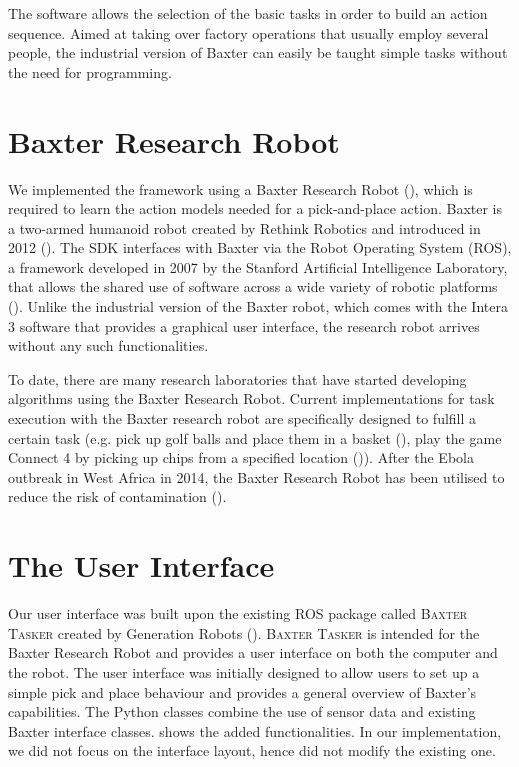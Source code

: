 The software allows the selection of the basic tasks in order to build an action sequence.
Aimed at taking over factory operations that usually employ several people, the industrial version of Baxter can easily be taught simple tasks without the need for programming.


\section{Baxter Research Robot}
We implemented the framework using a Baxter Research Robot (\cite{robotics2013baxter}), which is required to learn the action models needed for a pick-and-place action.
Baxter is a two-armed humanoid robot created by Rethink Robotics and introduced in 2012 (\cite{robotics2013baxter}).
The SDK interfaces with Baxter via the Robot Operating System (ROS), a framework developed in 2007 by the Stanford Artificial Intelligence Laboratory, that allows the shared use of software across a wide variety of robotic platforms (\cite{fernandez2015learning}).
Unlike the industrial version of the Baxter robot, which comes with the Intera 3 software that provides a graphical user interface, the research robot arrives without any such functionalities.

To date, there are many research laboratories that have started developing algorithms using the Baxter Research Robot.
Current implementations for task execution with the Baxter research robot are specifically designed to fulfill a certain task (e.g.
pick up golf balls and place them in a basket (\cite{BaxterGolf}), play the game Connect 4 by picking up chips from a specified location (\cite{Connect4})).
After the Ebola outbreak in West Africa in 2014, the Baxter Research Robot has been utilised to reduce the risk of contamination (\cite{Ebola}).


\section{The User Interface}
Our user interface was built upon the existing ROS package called \textsc{Baxter Tasker} created by Generation Robots (\cite{BaxterTasker}).
\textsc{Baxter Tasker} is intended for the Baxter Research Robot and provides a user interface on both the computer and the robot.
The user interface was initially designed to allow users to set up a simple pick and place behaviour and provides a general overview of Baxter's capabilities.
The Python classes combine the use of sensor data and existing Baxter interface classes.
  shows the added functionalities.
In our implementation, we did not focus on the interface layout, hence did not modify the existing one.

